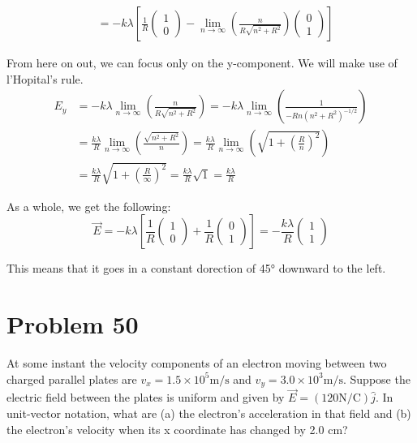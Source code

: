 \documentclass[12pt]{article}
\begin{document}
\begin{align*}
        &=  -k\lambda \left[\frac{1}{R} \begin{pmatrix}1\\0\end{pmatrix} - \lim_{n \rightarrow \infty}\left(\frac{n}{R\sqrt{n^2 + R^2}}\right) \begin{pmatrix}0\\1\end{pmatrix}\right]
\end{align*}

From here on out, we can focus only on the y-component. We will make use of l'Hopital's rule.
\begin{align*}
    E_y &=  -k\lambda \lim_{n \rightarrow \infty}\left(\frac{n}{R\sqrt{n^2 + R^2}}\right)
        =   -k\lambda \lim_{n \rightarrow \infty}\left(\frac{1}{-Rn(n^2 + R^2)^{-1/2}}\right)\\
        &=  \frac{k\lambda}{R} \lim_{n \rightarrow \infty}\left(\frac{\sqrt{n^2 + R^2}}{n}\right)
        =   \frac{k\lambda}{R} \lim_{n \rightarrow \infty}\left(\sqrt{1 + \left(\frac{R}{n}\right)^2}\right)\\
        &=  \frac{k\lambda}{R} \sqrt{1 + \left(\frac{R}{\infty}\right)^2}
        =   \frac{k\lambda}{R} \sqrt{1}
        =   \frac{k\lambda}{R}
\end{align*}

As a whole, we get the following:
\begin{equation*}
    \vec{E} =   -k\lambda \left[\frac{1}{R} \begin{pmatrix}1\\0\end{pmatrix} + \frac{1}{R} \begin{pmatrix}0\\1\end{pmatrix}\right]
        =   -\frac{k\lambda}{R}\begin{pmatrix} 1\\1 \end{pmatrix}
\end{equation*}

This means that it goes in a constant dorection of 45\unit{\degree} downward to the left.

\pagebreak
\section{Problem 50}
At some instant the velocity components of an electron moving between two charged parallel plates are $v_x = 1.5 \times 10^5 \unit{\meter/\second}$ and $v_y = 3.0 \times 10^3 \unit{\meter/\second}$. Suppose the electric field between the plates is uniform and given by $\vec{E} = (120 \unit{\newton/\coulomb})\hat{j}$. In unit-vector notation, what are (a) the electron's acceleration in that field and (b) the electron's velocity when its x coordinate has changed by 2.0 cm?
\end{document}
